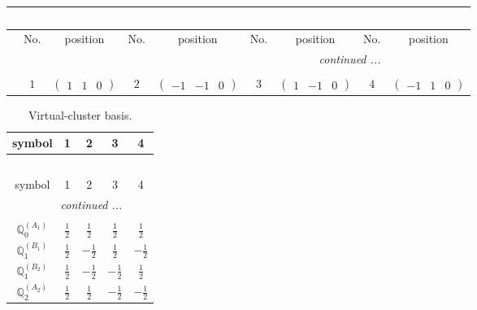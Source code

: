 \documentclass[fleqn,10pt,landscape]{article}
\begin{document}
\begin{itemize}
{\begin{center}
\begin{longtable}{ccccccccc}
\multicolumn{8}{l}{\tablename\ \thetable{}} \\
 \hline \hline
 & No. & position & No. & position & No. & position & No. & position \\ \hline \endhead

 \hline \hline
\multicolumn{8}{r}{\footnotesize\it continued ...} \\ \endfoot

 \hline \hline
\multicolumn{8}{r}{} \\ \endlastfoot

 & $ 1 $ & $ \begin{pmatrix} 1 & 1 & 0 \end{pmatrix} $ & $ 2 $ & $ \begin{pmatrix} -1 & -1 & 0 \end{pmatrix} $ & $ 3 $ & $ \begin{pmatrix} 1 & -1 & 0 \end{pmatrix} $ & $ 4 $ & $ \begin{pmatrix} -1 & 1 & 0 \end{pmatrix} $ \\
\end{longtable}
\end{center}
\begin{center}
\renewcommand{\arraystretch}{1.7}
\begin{longtable}{ccccc}
\caption{Virtual-cluster basis.}
 \\
 \hline \hline
symbol & 1 & 2 & 3 & 4 \\ \hline \endfirsthead

\multicolumn{4}{l}{\tablename\ \thetable{}} \\
 \hline \hline
symbol & 1 & 2 & 3 & 4 \\ \hline \endhead

 \hline \hline
\multicolumn{4}{r}{\footnotesize\it continued ...} \\ \endfoot

 \hline \hline
\multicolumn{4}{r}{} \\ \endlastfoot

$\mathbb{Q}_{0}^{(A_{1})}$ & $ \frac{1}{2} $ & $ \frac{1}{2} $ & $ \frac{1}{2} $ & $ \frac{1}{2} $ \\ \hline
$\mathbb{Q}_{1}^{(B_{1})}$ & $ \frac{1}{2} $ & $ - \frac{1}{2} $ & $ \frac{1}{2} $ & $ - \frac{1}{2} $ \\ \hline
$\mathbb{Q}_{1}^{(B_{2})}$ & $ \frac{1}{2} $ & $ - \frac{1}{2} $ & $ - \frac{1}{2} $ & $ \frac{1}{2} $ \\ \hline
$\mathbb{Q}_{2}^{(A_{2})}$ & $ \frac{1}{2} $ & $ \frac{1}{2} $ & $ - \frac{1}{2} $ & $ - \frac{1}{2} $ \\
\end{longtable}
\end{center}
}
\end{itemize}
\end{document}

